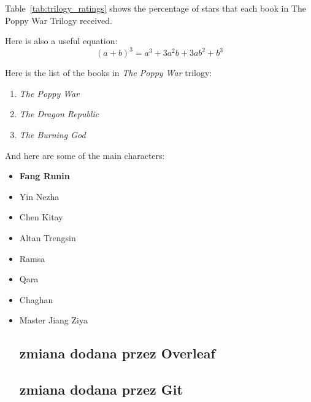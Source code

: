 Table~\ref{tab:trilogy_ratings} shows the percentage of stars that each book in The Poppy War Trilogy received.

\begin{table}[H]
    \centering
    
\end{table}

Here is also a useful equation: \[(a+b)^3=a^3+3a^2b+3ab^2+b^3\]

Here is the list of the books in \textit{The Poppy War} trilogy:
\begin{enumerate}
    \item \textit{The Poppy War}
    \item \textit{The Dragon Republic} 
    \item \textit{The Burning God}
\end{enumerate}

And here are some of the main characters:
\begin{itemize}
    \item \textbf{Fang Runin}
    \item Yin Nezha
    \item Chen Kitay
    \item Altan Trengsin
    \item Ramsa
    \item Qara
    \item Chaghan
    \item Master Jiang Ziya

\subsection{zmiana dodana przez Overleaf}
\subsection{zmiana dodana przez Git}
\end{itemize}



